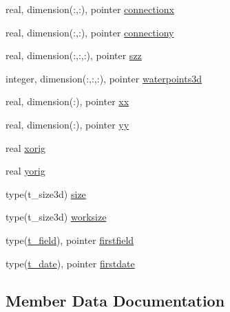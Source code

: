 \begin{DoxyCompactItemize}
\item 
real, dimension(\+:,\+:), pointer \mbox{\hyperlink{structmodulecfformat_1_1t__cfformat_a8f06263ede8eb8e0775d101017bf23a9}{connectionx}}
\item 
real, dimension(\+:,\+:), pointer \mbox{\hyperlink{structmodulecfformat_1_1t__cfformat_ac75b918dbef03ba2ecd1db62224dadb9}{connectiony}}
\item 
real, dimension(\+:,\+:,\+:), pointer \mbox{\hyperlink{structmodulecfformat_1_1t__cfformat_a5b4b2a4761c48efd6b7515444e28d774}{szz}}
\item 
integer, dimension(\+:,\+:,\+:), pointer \mbox{\hyperlink{structmodulecfformat_1_1t__cfformat_a2a65714b276d1848043ad1af42dfa38f}{waterpoints3d}}
\item 
real, dimension(\+:), pointer \mbox{\hyperlink{structmodulecfformat_1_1t__cfformat_a317fe3f07880f127577a9651e44c9396}{xx}}
\item 
real, dimension(\+:), pointer \mbox{\hyperlink{structmodulecfformat_1_1t__cfformat_aa2888709db722a7aa96dd0cd01ff6ea3}{yy}}
\item 
real \mbox{\hyperlink{structmodulecfformat_1_1t__cfformat_ab41f8e3e09c6939ed612d3b1765c39ee}{xorig}}
\item 
real \mbox{\hyperlink{structmodulecfformat_1_1t__cfformat_a73a9ed51287124a2741f42a2c0ddb539}{yorig}}
\item 
type(t\+\_\+size3d) \mbox{\hyperlink{structmodulecfformat_1_1t__cfformat_a9f7e9a28914073b8e470b024a9bed1c6}{size}}
\item 
type(t\+\_\+size3d) \mbox{\hyperlink{structmodulecfformat_1_1t__cfformat_a3cbd85a8352e56b65486849f406a9a85}{worksize}}
\item 
type(\mbox{\hyperlink{structmodulecfformat_1_1t__field}{t\+\_\+field}}), pointer \mbox{\hyperlink{structmodulecfformat_1_1t__cfformat_a6b5de953b9490f7f7388445abfc5a343}{firstfield}}
\item 
type(\mbox{\hyperlink{structmodulecfformat_1_1t__date}{t\+\_\+date}}), pointer \mbox{\hyperlink{structmodulecfformat_1_1t__cfformat_a49f4d1293251b994516f5b9724495386}{firstdate}}
\end{DoxyCompactItemize}


\subsection{Member Data Documentation}
\mbox{\label{structmodulecfformat_1_1t__cfformat_ae47bfd570e37c1f46a133c289fbb10c1}} 
